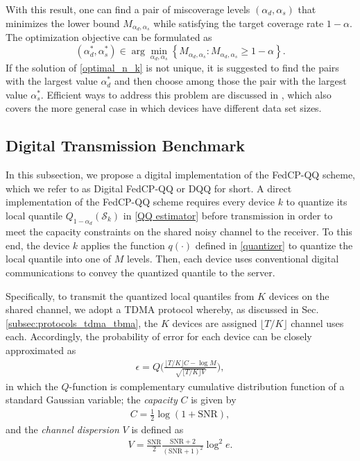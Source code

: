 \documentclass[12pt, draftclsnofoot, onecolumn]{IEEEtran}
\begin{document}
With this result, one can find a pair of miscoverage levels $(\alpha_d,\alpha_s)$ that minimizes the lower bound $M_{\alpha_d, \alpha_s}$ while satisfying the target coverage rate $1-\alpha$. The optimization objective can be formulated as
\begin{equation}\label{optimal_n_k}
    \left(\alpha_d^*, \alpha_s^*\right)\in \arg \min_{\alpha_d, \alpha_s}\left\{M_{\alpha_d,\alpha_s}: M_{\alpha_d,\alpha_s} \geq 1-\alpha\right\}.
\end{equation}
If the solution of \eqref{optimal_n_k} is not unique, it is suggested to find the pairs with the largest value $\alpha_d^*$  and then choose among those the pair with the largest value $\alpha_s^*$. Efficient ways to address this problem are discussed in \cite{FedCP-QQ}, which also covers the more general case in which devices have different data set sizes.


\subsection{Digital Transmission Benchmark}\label{Digital FedCP-QQ}
In this subsection, we propose a digital implementation of the FedCP-QQ scheme, which we refer to as Digital FedCP-QQ or DQQ for short.
A direct implementation of the FedCP-QQ scheme requires every device $k$ to quantize its local quantile $Q_{1-\alpha_d}(\mathcal{S}_k)$ in \eqref{QQ estimator} before transmission in order to meet the capacity constraints on the shared noisy channel to the receiver. To this end, the device $k$  applies the function $q(\cdot)$ defined in \eqref{quantizer} to quantize the local quantile into one of $M$ levels. Then, each device uses conventional digital communications to convey the quantized quantile to the server.

Specifically, to transmit the quantized local quantiles from $K$ devices on the shared channel, we adopt a TDMA protocol whereby, as discussed in Sec. \ref{subsec:protocols_tdma_tbma}, the $K$ devices are assigned $\lfloor T/K\rfloor$ channel uses each. Accordingly, the probability of error for each device can be closely approximated as \cite[Theorem 54]{polyanskiy2010channel}
\begin{align}\label{P_error}
    \epsilon = Q\bigg( \frac{\lfloor T/K \rfloor C - \log M}{\sqrt{\lfloor T/K \rfloor V}} \bigg),
\end{align}
in which the $Q$-function is complementary cumulative distribution function of a standard Gaussian variable; the \emph{capacity} $C$ is given by
\begin{align}\label{capacity}
    C=\frac{1}{2}\log(1+\text{SNR}),
\end{align}
and the \emph{channel dispersion} $V$ is defined as
\begin{align}\label{dispersion}
    V=\frac{\text{SNR}}{2}\frac{\text{SNR}+2}{(\text{SNR}+1)^2}\log^2e.
\end{align}
\end{document}
